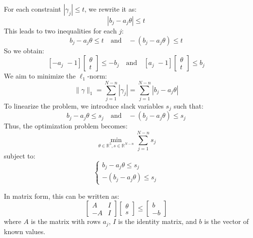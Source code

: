 For each constraint \(|\gamma_j| \leq t\), we rewrite it as:
\[
|b_j - a_j \theta| \leq t
\]
This leads to two inequalities for each \(j\):
\[
b_j - a_j \theta \leq t \quad \text{and} \quad -(b_j - a_j \theta) \leq t
\]
So we obtain:
\[
\left[ -a_j \,\, -1 \right] 
\begin{bmatrix} \theta \\ t \end{bmatrix} \leq -b_j \quad \text{and} \quad 
\left[ a_j \,\, -1 \right] 
\begin{bmatrix} \theta \\ t \end{bmatrix} \leq b_j
\]
We aim to minimize the \(\ell_1\)-norm:
\[
\|\gamma\|_1 = \sum_{j=1}^{N-n} |\gamma_j| = \sum_{j=1}^{N-n} |b_j - a_j \theta|
\]
To linearize the problem, we introduce slack variables \(s_j\) such that:
\[
b_j - a_j \theta \leq s_j \quad \text{and} \quad -(b_j - a_j \theta) \leq s_j
\]
Thus, the optimization problem becomes:
\[
\min_{\theta \in \mathbb{R}^5, s \in \mathbb{R}^{N-n}} \sum_{j=1}^{N-n} s_j
\]
subject to:
\[
\begin{cases}
b_j - a_j \theta \leq s_j \\
-(b_j - a_j \theta) \leq s_j
\end{cases}
\]

In matrix form, this can be written as:
\[
\begin{bmatrix}
A & I \\
-A & I
\end{bmatrix}
\begin{bmatrix}
\theta \\
s
\end{bmatrix}
\leq
\begin{bmatrix}
b \\
-b
\end{bmatrix}
\]
where \(A\) is the matrix with rows \(a_j\), \(I\) is the identity matrix, and \(b\) is the vector of known values.
